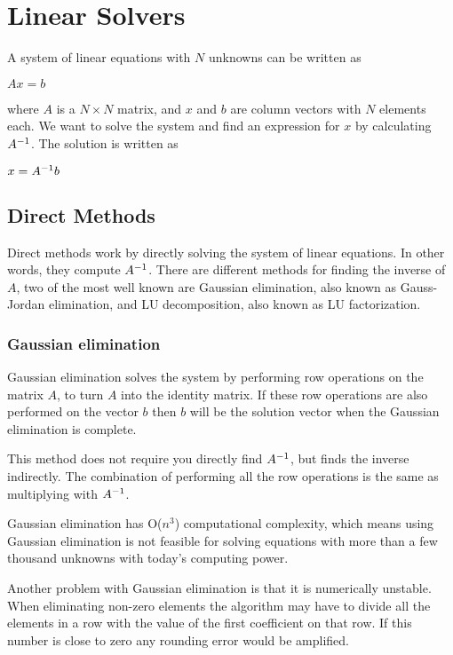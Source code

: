 \section*{Linear Solvers}

A system of linear equations with $N$ unknowns can be written as 

$Ax = b$

where $A$ is a $N \times N$ matrix, and $x$ and $b$ are column vectors with $N$ 
elements each. We want to solve the system and find an expression for $x$ by calculating
${A}^{-1}$. The solution is written as 

$x = {A}^{-1}b$

\subsection*{Direct Methods}

Direct methods work by directly solving the system of linear equations. In other 
words, they compute ${A}^{-1}$. There are different methods for finding the inverse
of $A$, two of the most well known are Gaussian elimination, also known as Gauss-
Jordan elimination, and LU decomposition, also known as LU factorization.

\subsubsection*{Gaussian elimination}

Gaussian elimination solves the system by performing row operations on the matrix 
$A$, to turn $A$ into the identity matrix. If these row operations are also performed 
on the vector $b$ then $b$ will be the solution vector when the Gaussian elimination 
is complete.

This method does not require you directly find ${A}^{-1}$, but finds the inverse 
indirectly. The combination of performing all the row operations is the same as 
multiplying with ${A}^{-1}$.

Gaussian elimination has O($n^3$) computational complexity, which means using 
Gaussian elimination is not feasible for solving equations with more than a few 
thousand unknowns with today's computing power.

Another problem with Gaussian elimination is that it is numerically unstable. 
When eliminating non-zero elements the algorithm may have to divide all the elements 
in a row with the value of the first coefficient on that row. If this number is 
close to zero any rounding error would be amplified.

